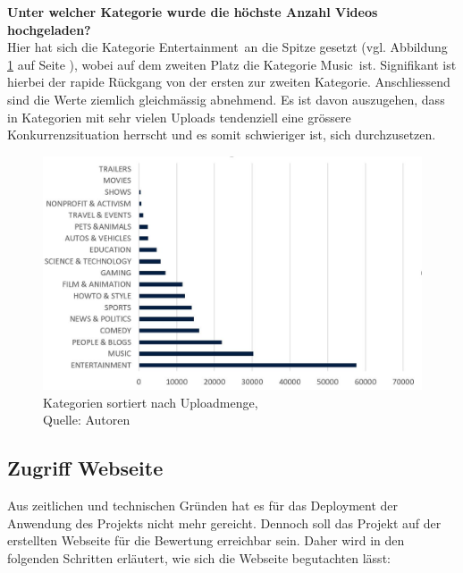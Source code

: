 \documentclass[12pt,titlepage]{article}
\begin{document}
\textbf{Unter welcher Kategorie wurde die höchste Anzahl Videos hochgeladen?}\\
Hier hat sich die Kategorie \glqq Entertainment\grqq\, an die Spitze gesetzt (vgl. Abbildung \ref{img: Kategorien sortiert nach Uploadmenge} auf Seite \pageref{img: Kategorien sortiert nach Uploadmenge}), wobei auf dem zweiten Platz die Kategorie \glqq Music\grqq\, ist. Signifikant ist hierbei der rapide Rückgang von der ersten zur zweiten Kategorie. Anschliessend sind die Werte ziemlich gleichmässig abnehmend. Es ist davon auszugehen, dass in Kategorien mit sehr vielen Uploads tendenziell eine grössere Konkurrenzsituation herrscht und es somit schwieriger ist, sich durchzusetzen. 
\begin{figure}[h]
	\centering
	\includegraphics[width=14cm]{IMG/grafik_meisteVideos.JPG}
	\caption[Kategorien sortiert nach Uploadmenge]{Kategorien sortiert nach Uploadmenge,\\ Quelle: Autoren}
	\label{img: Kategorien sortiert nach Uploadmenge}
\end{figure}
\clearpage


\subsection{Zugriff Webseite}
Aus zeitlichen und technischen Gründen hat es für das Deployment der Anwendung des Projekts nicht mehr gereicht. Dennoch soll das Projekt auf der erstellten Webseite für die Bewertung erreichbar sein. Daher wird in den folgenden Schritten erläutert, wie sich die Webseite begutachten lässt:
\end{document}
